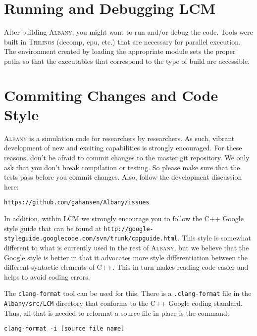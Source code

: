 \documentclass{article}
\newcommand{\trilinos}{\textsc{Trilinos}}
\newcommand{\albany}{\textsc{Albany}}
\newcommand{\lcm}{\textsc{LCM}}
\begin{document}
\section{Running and Debugging \lcm{}} 

After building \albany{}, you might want to run and/or debug the code.
Tools were built in \trilinos{} (decomp, epu, etc.) that are necessary
for parallel execution. The environment created by loading the
appropriate module sets the proper paths so that the executables that
correspond to the type of build are accessible.

\section{Commiting Changes and Code Style}
\albany{} is a simulation code for researchers by researchers. As
such, vibrant development of new and exciting capabilities is strongly
encouraged. For these reasons, don't be afraid to commit changes to
the master git repository. We only ask that you don't break
compilation or testing. So please make sure that the tests pass before
you commit changes. Also, follow the development discussion here:
\begin{verbatim}
https://github.com/gahansen/Albany/issues
\end{verbatim}

In addition, within \lcm{} we strongly encourage you to follow the C++
Google style guide that can be found at
\verb+http://google-styleguide.googlecode.com/svn/trunk/cppguide.html+.
This style is somewhat different to what is currently used in the rest
of \albany{}, but we believe that the Google style is better in that
it advocates more style differentiation between the different
syntactic elements of C++. This in turn makes reading code easier and
helps to avoid coding errors.

The \verb+clang-format+ tool can be used for this. There is a
\verb+.clang-format+ file in the \verb+Albany/src/LCM+ directory that conforms
to the C++ Google coding standard. Thus, all that is needed to reformat a
source file in place is the command:
\begin{verbatim}
clang-format -i [source file name]
\end{verbatim}
\end{document}
